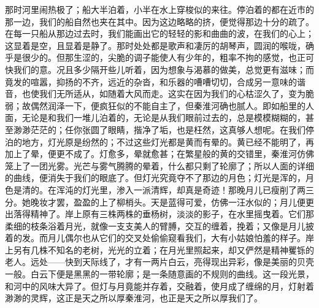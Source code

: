 \documentclass[12pt,UTF-8,openany]{ctexbook}
\begin{document}
\begin{normalsize}
    那时河里闹热极了；船大半泊着，小半在水上穿梭似的来往。停泊着的都在近市的那一边，我们的船自然也夹在其中。因为这边略略的挤，便觉得那边十分的疏了。在每一只船从那边过去时，我们能画出它的轻轻的影和曲曲的波，在我们的心上；这显着是空，且显着是静了。那时处处都是歌声和凄厉的胡琴声，圆润的喉咙，确乎是很少的。但那生涩的，尖脆的调子能使人有少年的，粗率不拘的感觉，也正可快我们的意。况且多少隔开些儿听着，因为想象与渴慕的做美，总觉更有滋味；而竟发的喧嚣，抑扬的不齐，远近的杂沓，和乐器的嘈嘈切切，合成另一意味的谐音，也使我们无所适从，如随着大风而走。这实在因为我们的心枯涩久了，变为脆弱；故偶然润泽一下，便疯狂似的不能自主了，但秦淮河确也腻人。即如船里的人面，无论是和我们一堆儿泊着的，无论是从我们眼前过去的，总是模模糊糊的，甚至渺渺茫茫的；任你张圆了眼睛，揩净了垢，也是枉然，这真够人想呢。在我们停泊的地方，灯光原是纷然的；不过这些灯光都是黄而有晕的。黄已经不能明了，再加上了晕，便更不成了。灯愈多，晕就愈甚；在繁星般的黄的交错里，秦淮河仿佛笼上了一团光雾。光芒与雾气腾腾的晕着，什么都只剩了轮廓了；所以人面的详细的曲线，便消失于我们的眼底了。但灯光究竟夺不了那边的月色；灯光是浑的，月色是清的。在浑沌的灯光里，渗入一派清辉，却真是奇迹！那晚月儿已瘦削了两三分。她晚妆才罢，盈盈的上了柳梢头。天是蓝得可爱，仿佛一汪水似的；月儿便更出落得精神了。岸上原有三株两株的垂杨树，淡淡的影子，在水里摇曳着。它们那柔细的枝条浴着月光，就像一支支美人的臂膊，交互的缠着，挽着；又像是月儿披着的发。而月儿偶尔也从它们的交叉处偷偷窥看我们，大有小姑娘怕羞的样子。岸上另有几株不知名的老树，光光的立着；在月光里照起来，却又俨然是精神矍铄的老人。远处——快到天际线了，才有一两片白云，亮得现出异彩，像是美丽的贝壳一般。白云下便是黑黑的一带轮廓；是一条随意画的不规则的曲线。这一段光景，和河中的风味大异了。但灯与月竟能并存着，交融着，使月成了缠绵的月，灯射着渺渺的灵辉，这正是天之所以厚秦淮河，也正是天之所以厚我们了。
    

\end{normalsize}
\end{document}
